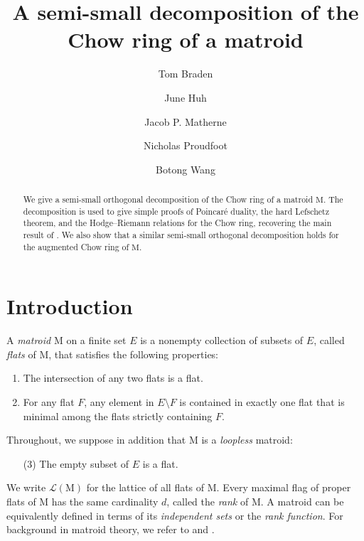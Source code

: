 \documentclass[11pt,reqno]{amsart}
\title{A semi-small decomposition of the Chow ring of a matroid}
\author{Tom Braden}
\author{June Huh}
\author{Jacob P. Matherne}
\author{Nicholas Proudfoot}
\author{Botong Wang}
\theoremstyle{definition}
\theoremstyle{remark}
\renewcommand{\(}{\left(}
\renewcommand{\)}{\right)}
\newcommand{\<}{\left<}
\renewcommand{\>}{\right>}
\begin{document}
\begin{abstract}
We give a semi-small orthogonal decomposition of the Chow ring of a matroid $\mathrm{M}$. %
The decomposition is used to give simple proofs of Poincar\'e duality, the hard Lefschetz theorem, and the Hodge--Riemann relations  for the Chow ring, recovering the main result of \cite{AHK}. %
We also %
show that a similar semi-small orthogonal decomposition holds for the augmented Chow ring of $\mathrm{M}$.
\end{abstract}

\maketitle



\section{Introduction}\label{SectionIntroduction}


A \emph{matroid} $\mathrm{M}$ on a finite set $E$ is a nonempty collection of subsets of $E$, called \emph{flats} of $\mathrm{M}$,
that satisfies the following properties:
\begin{enumerate}[(1)]\itemsep 5pt
\item The intersection of any two flats  is a flat.
\item For any flat $F$, any element in $E \setminus F$ is contained in exactly one flat  that is minimal among the flats strictly containing $F$.
\end{enumerate}
Throughout, we suppose in addition that $\mathrm{M}$ is a \emph{loopless} matroid:
\begin{enumerate}[(1)]\itemsep 5pt
\item[(3)]The empty subset of $E$ is a flat.
\end{enumerate}
We write $\mathscr{L}(\mathrm{M})$ for the lattice of all flats of $\mathrm{M}$.
Every maximal flag of proper flats of $\mathrm{M}$ has the same cardinality $d$, called the \emph{rank} of $\mathrm{M}$.
A matroid can be equivalently defined in terms of its \emph{independent sets} or the \emph{rank function}.
For background  in matroid theory, we refer to \cite{Oxley} and \cite{Welsh}. 
\end{document}
